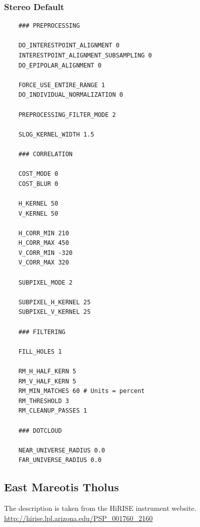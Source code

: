 \subsubsection*{Stereo Default}

\begin{verbatim}
    ### PREPROCESSING

    DO_INTERESTPOINT_ALIGNMENT 0
    INTERESTPOINT_ALIGNMENT_SUBSAMPLING 0
    DO_EPIPOLAR_ALIGNMENT 0

    FORCE_USE_ENTIRE_RANGE 1
    DO_INDIVIDUAL_NORMALIZATION 0

    PREPROCESSING_FILTER_MODE 2

    SLOG_KERNEL_WIDTH 1.5

    ### CORRELATION

    COST_MODE 0
    COST_BLUR 0

    H_KERNEL 50
    V_KERNEL 50

    H_CORR_MIN 210
    H_CORR_MAX 450
    V_CORR_MIN -320
    V_CORR_MAX 320

    SUBPIXEL_MODE 2

    SUBPIXEL_H_KERNEL 25
    SUBPIXEL_V_KERNEL 25

    ### FILTERING

    FILL_HOLES 1

    RM_H_HALF_KERN 5
    RM_V_HALF_KERN 5
    RM_MIN_MATCHES 60 # Units = percent
    RM_THRESHOLD 3
    RM_CLEANUP_PASSES 1

    ### DOTCLOUD

    NEAR_UNIVERSE_RADIUS 0.0
    FAR_UNIVERSE_RADIUS 0.0
\end{verbatim}

\subsection{East Mareotis Tholus}

The description is taken from the HiRISE instrument website.
\url{http://hirise.lpl.arizona.edu/PSP_001760_2160}

